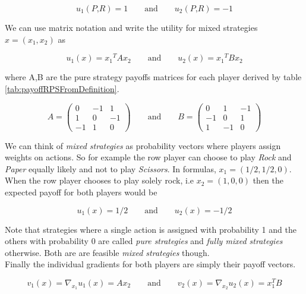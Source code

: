\begin{equation*}
    u_1(\textit{P,R}) = 1 \qquad \text{and} \qquad u_2(\textit{P,R}) = -1
\end{equation*}

We can use matrix notation and write the utility for mixed strategies $x = (x_1,x_2)$ as

\begin{equation*}
    u_1(x) = x{_1}^{T}Ax_2 \qquad \text{and} \qquad u_2(x) = x{_1}^{T}Bx_2
\end{equation*}

where A,B are the pure strategy payoffs matrices for each player derived by table \ref{tab:payoffRPSFromDefinition}.

\begin{equation*}
A = \begin{pmatrix}
0 & -1 & 1\\
1 & 0 & -1\\
-1 & 1 & 0
\end{pmatrix}
\qquad \text{and} \qquad
B = \begin{pmatrix}
0 & 1 & -1\\
-1 & 0 & 1\\
1 & -1 & 0
\end{pmatrix}
\end{equation*}

We can think of \textit{mixed strategies} as probability vectors where players assign weights on actions. So for example the row player can choose to play \textit{Rock} and \textit{Paper} equally likely and not to play \textit{Scissors}. In formulas, $x_1 = (1/2,1/2,0)$. When the row player chooses to play solely rock, i.e $x_2 = (1,0,0)$ then the expected payoff for both players would be

\begin{equation*}
    u_1(x) = 1/2  \qquad \text{and} \qquad u_2(x) = -1/2
\end{equation*}

Note that strategies where a single action is assigned with probability 1 and the others with probability 0 are called \textit{pure strategies} and \textit{fully mixed strategies} otherwise. Both are are feasible \textit{mixed strategies} though. \\ 

Finally the individual gradients for both players are simply their payoff vectors.

\begin{equation*}
    v_1(x) = \nabla_{x_1}u_1(x) = Ax_2 \qquad \text{and} \qquad v_2(x) = \nabla_{x_2}u_2(x) = x_{1}^{T}B
\end{equation*}


